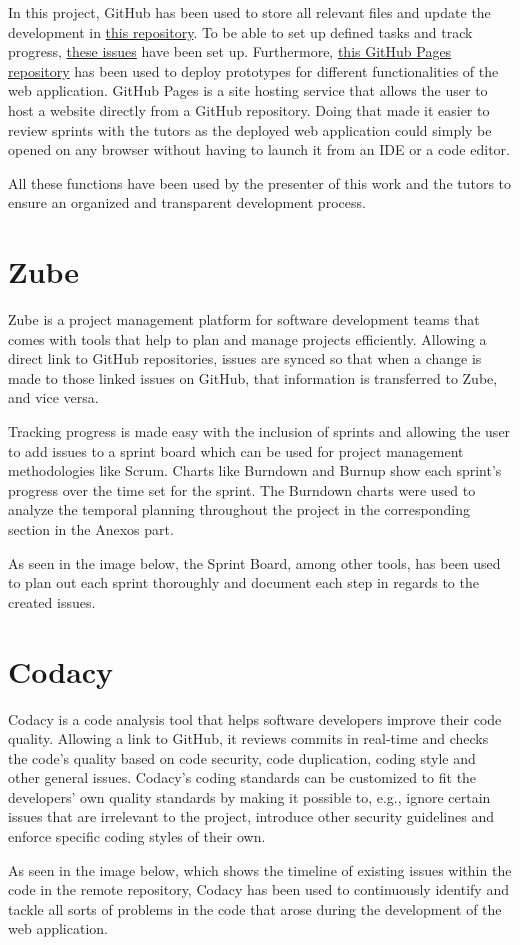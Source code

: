 In this project, GitHub has been used to store all relevant files and update the development in \href{https://github.com/danieldf01/TFG-decision-trees-sim/}{this repository}. To be able to set up defined tasks and track progress, \href{https://github.com/danieldf01/TFG-decision-trees-sim/issues}{these issues} have been set up. Furthermore, \href{https://danieldf01.github.io/}{this GitHub Pages repository} has been used to deploy prototypes for different functionalities of the web application. GitHub Pages is a site hosting service that allows the user to host a website directly from a GitHub repository. Doing that made it easier to review sprints with the tutors as the deployed web application could simply be opened on any browser without having to launch it from an IDE or a code editor.

All these functions have been used by the presenter of this work and the tutors to ensure an organized and transparent development process.

\section{Zube}
Zube is a project management platform for software development teams that comes with tools that help to plan and manage projects efficiently. Allowing a direct link to GitHub repositories, issues are synced so that when a change is made to those linked issues on GitHub, that information is transferred to Zube, and vice versa.

Tracking progress is made easy with the inclusion of sprints and allowing the user to add issues to a sprint board which can be used for project management methodologies like Scrum. Charts like Burndown and Burnup show each sprint's progress over the time set for the sprint. The Burndown charts were used to analyze the temporal planning throughout the project in the corresponding section in the Anexos part.

As seen in the image below, the Sprint Board, among other tools, has been used to plan out each sprint thoroughly and document each step in regards to the created issues.

\section{Codacy} \label{codacy}
Codacy is a code analysis tool that helps software developers improve their code quality. Allowing a link to GitHub, it reviews commits in real-time and checks the code's quality based on code security, code duplication, coding style and other general issues.
Codacy's coding standards can be customized to fit the developers' own quality standards by making it possible to, e.g., ignore certain issues that are irrelevant to the project, introduce other security guidelines and enforce specific coding styles of their own.

As seen in the image below, which shows the timeline of existing issues within the code in the remote repository, Codacy has been used to continuously identify and tackle all sorts of problems in the code that arose during the development of the web application.
